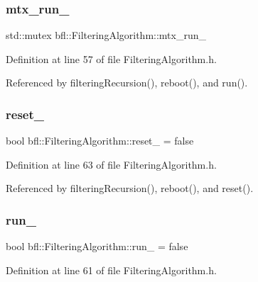 \subsubsection{\texorpdfstring{mtx\+\_\+run\+\_\+}{mtx\_run\_}}
{\footnotesize\ttfamily std\+::mutex bfl\+::\+Filtering\+Algorithm\+::mtx\+\_\+run\+\_\+\hspace{0.3cm}{\ttfamily [private]}}



Definition at line 57 of file Filtering\+Algorithm.\+h.



Referenced by filtering\+Recursion(), reboot(), and run().

\mbox{\label{classbfl_1_1FilteringAlgorithm_a4edf8ab29c4a1f8148ea276561299acb}} 
\subsubsection{\texorpdfstring{reset\+\_\+}{reset\_}}
{\footnotesize\ttfamily bool bfl\+::\+Filtering\+Algorithm\+::reset\+\_\+ = false\hspace{0.3cm}{\ttfamily [private]}}



Definition at line 63 of file Filtering\+Algorithm.\+h.



Referenced by filtering\+Recursion(), reboot(), and reset().

\mbox{\label{classbfl_1_1FilteringAlgorithm_a826eea2b551a2c2beab38394ed4c57c9}} 
\subsubsection{\texorpdfstring{run\+\_\+}{run\_}}
{\footnotesize\ttfamily bool bfl\+::\+Filtering\+Algorithm\+::run\+\_\+ = false\hspace{0.3cm}{\ttfamily [private]}}



Definition at line 61 of file Filtering\+Algorithm.\+h.



